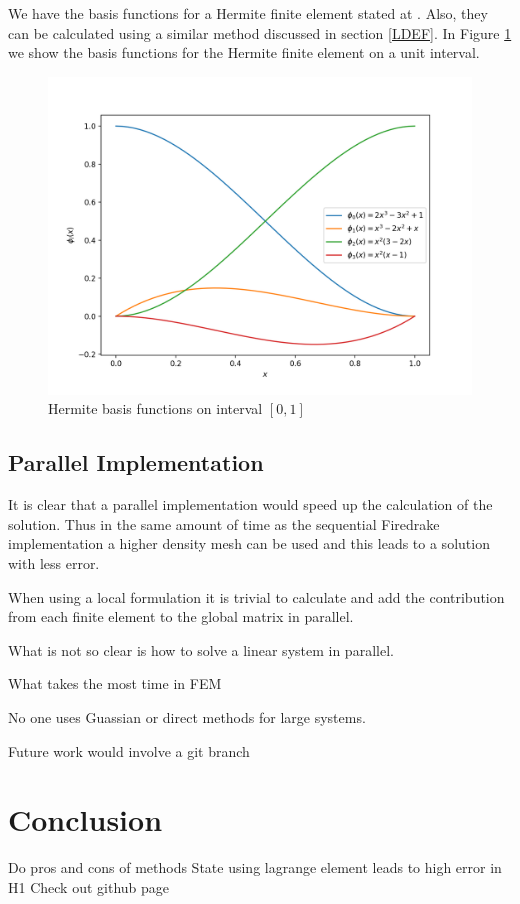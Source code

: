 \documentclass[12pt]{ociamthesis}
\begin{document}
We have the basis functions for a Hermite finite element stated at \cite{defelement}. Also, they can be calculated using a similar method discussed in section \ref{LDEF}. In Figure \ref{InterFuncsHER} we show the basis functions for the Hermite finite element on a unit interval.

\begin{figure}[H]
     \includegraphics[width=\textwidth]{Pics/BasisFunc/IntervalFuncsHER.png}
     \caption{Hermite basis functions on interval $[0,1]$}
     \label{InterFuncsHER}
\end{figure}

\subsection{Parallel Implementation}
It is clear that a parallel implementation would speed up the calculation of the solution. Thus in the same amount of time as the sequential Firedrake implementation a higher density mesh can be used and this leads to a solution with less error.

When using a local formulation it is trivial to calculate and add the contribution from each finite element to the global matrix in parallel.

What is not so clear is how to solve a linear system in parallel. 

What takes the most time in FEM

No one uses Guassian or direct methods for large systems.

Future work would involve a git branch 

\section{Conclusion}
Do pros and cons of methods
State using lagrange element leads to high error in H1
Check out github page \cite{Hub}
\end{document}
